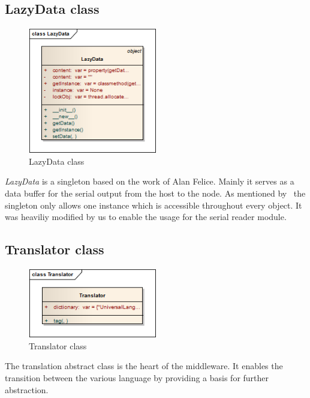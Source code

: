 \newpage
\subsection{LazyData class}
\begin{figure}[H]
   \centering
   \includegraphics[width=0.5\textwidth]{pic/LazyData.png}%
   \caption{LazyData class}
   \label{LazyDatapic}%
\end{figure}

\textit{LazyData} is a singleton based on the work of Alan Felice. Mainly it serves as a data buffer for the serial output from the host to the node. 
As mentioned by~\cite{GammaHelmJohnsonVlissides199711} the singleton only allows one instance which is accessible throughout every object. It was
heaviliy modified by us to enable the usage for the serial reader module.

\newpage
\subsection{Translator class}
\begin{figure}[H]
   \centering
   \includegraphics[width=0.5\textwidth]{pic/Translator.png}%
   \caption{Translator class}
   \label{Translatorpic}%
\end{figure}

The translation abstract class is the heart of the middleware. It enables the transition between the various language by providing a basis for further 
abstraction.

